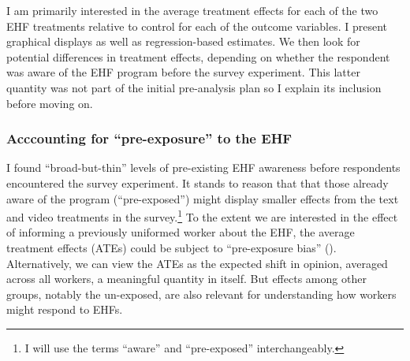 \documentclass[
  11pt,
  oneside]{article}
\begin{document}
I am primarily interested in the average treatment effects for each of the two EHF treatments relative to control for each of the outcome variables. I present graphical displays as well as regression-based estimates. We then look for potential differences in treatment effects, depending on whether the respondent was aware of the EHF program before the survey experiment. This latter quantity was not part of the initial pre-analysis plan so I explain its inclusion before moving on.

\subsubsection{Acccounting for ``pre-exposure'' to the EHF}\label{acccounting-for-pre-exposure-to-the-ehf}

I found ``broad-but-thin'' levels of pre-existing EHF awareness before respondents encountered the survey experiment. It stands to reason that that those already aware of the program (``pre-exposed'') might display smaller effects from the text and video treatments in the survey.\footnote{I will use the terms ``aware'' and ``pre-exposed'' interchangeably.} To the extent we are interested in the effect of informing a previously uniformed worker about the EHF, the average treatment effects (ATEs) could be subject to ``pre-exposure bias'' (). Alternatively, we can view the ATEs as the expected shift in opinion, averaged across all workers, a meaningful quantity in itself. But effects among other groups, notably the un-exposed, are also relevant for understanding how workers might respond to EHFs.
\end{document}

